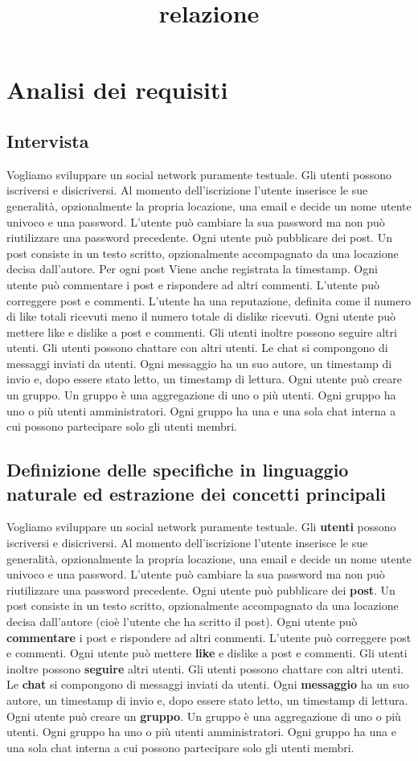 \documentclass[a4paper,12pt]{report}
\begin{document}
\tableofcontents

\title{relazione}

\chapter{Analisi dei requisiti}
\section{Intervista}
Vogliamo sviluppare un social network puramente testuale.
Gli utenti possono iscriversi e disicriversi. Al momento dell'iscrizione l'utente inserisce le sue generalità, opzionalmente la propria locazione, una email e decide un nome utente univoco e una password.
L'utente può cambiare la sua password ma non può riutilizzare una password precedente.
Ogni utente può pubblicare dei post. Un post consiste in un testo scritto, opzionalmente accompagnato da una locazione decisa dall'autore. 
Per ogni post Viene anche registrata la timestamp.
Ogni utente può commentare i post e rispondere ad altri commenti.
L'utente può correggere post e commenti.
L'utente ha una reputazione, definita come il numero di like totali ricevuti meno il numero totale di dislike ricevuti.
Ogni utente può mettere like e dislike a post e commenti.
Gli utenti inoltre possono seguire altri utenti.
Gli utenti possono chattare con altri utenti. Le chat si compongono di messaggi inviati da utenti. Ogni messaggio ha un suo autore, un timestamp di invio e, dopo essere stato letto, un timestamp di lettura.
Ogni utente può creare un gruppo. Un gruppo è una aggregazione di uno o più utenti. Ogni gruppo ha uno o più utenti amministratori.
Ogni gruppo ha una e una sola chat interna a cui possono partecipare solo gli utenti membri.
\section{Definizione delle specifiche in linguaggio naturale ed estrazione dei concetti principali}
Vogliamo sviluppare un social network puramente testuale.
Gli \textbf{utenti} possono iscriversi e disicriversi. Al momento dell'iscrizione l'utente inserisce le sue generalità, opzionalmente la propria locazione, una email e decide un nome utente univoco e una password.
L'utente può cambiare la sua password ma non può riutilizzare una password precedente.
Ogni utente può pubblicare dei \textbf{post}. Un post consiste in un testo scritto, opzionalmente accompagnato da una locazione decisa dall'autore (cioè l'utente che ha scritto il post).
Ogni utente può \textbf{commentare} i post e rispondere ad altri commenti.
L'utente può correggere post e commenti.
Ogni utente può mettere \textbf{like} e dislike a post e commenti.
Gli utenti inoltre possono \textbf{seguire} altri utenti.
Gli utenti possono chattare con altri utenti. Le \textbf{chat} si compongono di messaggi inviati da utenti. Ogni \textbf{messaggio} ha un suo autore, un timestamp di invio e, dopo essere stato letto, un timestamp di lettura.
Ogni utente può creare un \textbf{gruppo}. Un gruppo è una aggregazione di uno o più utenti. Ogni gruppo ha uno o più utenti amministratori.
Ogni gruppo ha una e una sola chat interna a cui possono partecipare solo gli utenti membri.
\end{document}

